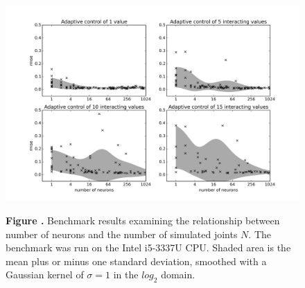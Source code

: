 \documentclass{frontiersSCNS} %
\begin{document}
\begin{figure}[h!]
\begin{center}
\includegraphics[width=18cm]{figures/plot_vary_neurons}
\end{center}
 \textbf{\label{fig:analysis_neurons_cpu} Figure .}{ Benchmark results examining the relationship
     between number of neurons and the number of simulated joints $N$.  The
     benchmark was run on the Intel i5-3337U CPU.  Shaded
 area is the mean plus or minus one standard deviation, smoothed with a Gaussian kernel of $\sigma=1$ in the $log_2$ domain.}
\end{figure}



\end{document}
